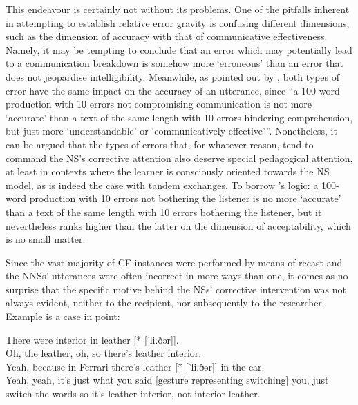 \documentclass[output=paper,colorlinks,citecolor=brown,modfonts,nonflat]{../langscibook}
\begin{document}
This endeavour is certainly not without its problems. One of the pitfalls inherent in attempting to establish relative error gravity is confusing different dimensions, such as the dimension of accuracy with that of communicative effectiveness. Namely, it may be tempting to conclude that an error which may potentially lead to a communication breakdown is somehow more ‘erroneous’ than an error that does not jeopardise intelligibility. Meanwhile, as pointed out by \citet[592]{Pallotti2009}, both types of error have the same impact on the accuracy of an utterance, since “a 100-word production with 10 errors not compromising communication is not more ‘accurate’ than a text of the same length with 10 errors hindering comprehension, but just more ‘understandable’ or ‘communicatively effective’”. Nonetheless, it can be argued that the types of errors that, for whatever reason, tend to command the NS’s corrective attention also deserve special pedagogical attention, at least in contexts where the learner is consciously oriented towards the NS model, as is indeed the case with tandem exchanges. To borrow \citeauthor{Pallotti2009}’s logic: a 100-word production with 10 errors not bothering the listener is no more ‘accurate’ than a text of the same length with 10 errors bothering the listener, but it nevertheless ranks higher than the latter on the dimension of acceptability, which is no small matter.



Since the vast majority of CF instances were performed by means of recast and the NNSs’ utterances were often incorrect in more ways than one, it comes as no surprise that the specific motive behind the NSs’ corrective intervention was not always evident, neither to the recipient, nor subsequently to the researcher. Example  is a case in point: 


\ea\label{ex:scheuer:11}
{\NNS} {There} {were} {interior} {in} {leather} [* ['liːðər]].\\
{\NS} {Oh,} {the} {leather,} {oh,} {so} {there’s} {leather} {interior.}\\
{\NNS} {Yeah,} {because} {in} {Ferrari} {there’s} {leather} [* ['liːðər]] {in} {the} {car.}\\
{\NS} {Yeah,} {yeah,} {it’s} {just} {what} {you} {said} [gesture representing switching] {you,} {just} {switch} {the} {words} {so} {it’s} {leather} {interior,} {not} {interior} {leather.}\\
\z
\end{document}
